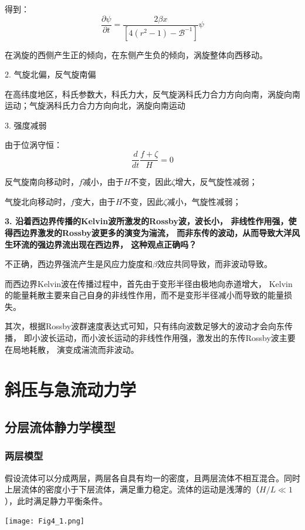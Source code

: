 \documentclass{article}
\begin{document}
得到：
$$\frac{\partial \psi }{\partial t}=\frac{2\beta x}{\left[ 4({{r}^{2}}-1)-{{\mathcal{B}}^{-1}} \right]}\psi$$

在涡旋的西侧产生正的倾向，在东侧产生负的倾向，涡旋整体向西移动。

2. 气旋北偏，反气旋南偏 

在高纬度地区，科氏参数大，科氏力大，反气旋涡科氏力合力方向向南，涡旋向南运动；气旋涡科氏力合力方向向北，涡旋向南运动

3. 强度减弱

由于位涡守恒：
$$\frac{d}{dt}\frac{f+\zeta}{H}=0$$

反气旋南向移动时，$f$减小，由于$H$不变，因此$\zeta$增大，反气旋性减弱；

气旋北向移动时，$f$变大，由于$H$不变，因此$\zeta$减小，气旋性减弱；

\textbf{3. 沿着西边界传播的Kelvin波所激发的Rossby波，波长小，
非线性作用强，使得西边界激发的Rossby波更多的演变为湍流，
而非东传的波动，从而导致大洋风生环流的强边界流出现在西边界，
这种观点正确吗？}

不正确，西边界强流产生是风应力旋度和$\beta$效应共同导致，而非波动导致。

而西边界Kelvin波在传播过程中，首先由于变形半径由极地向赤道增大，
Kelvin的能量耗散主要来自己自身的非线性作用，而不是变形半径减小而导致的能量损失。

其次，根据Rossby波群速度表达式可知，只有纬向波数足够大的波动才会向东传播，
即小波长运动，而小波长运动的非线性作用强，激发出的东传Rossby波主要在局地耗散，
演变成湍流而非波动。

\newpage

\section{斜压与急流动力学}
\subsection{分层流体静力学模型}
\subsubsection{两层模型}
假设流体可以分成两层，两层各自具有均一的密度，且两层流体不相互混合。同时上层流体的密度小于下层流体，满足重力稳定。流体的运动是浅薄的（$H/L \ll 1$），此时满足静力平衡条件。

\begin{center}
\texttt{[image: Fig4\_1.png]}
\end{center}
\end{document}
